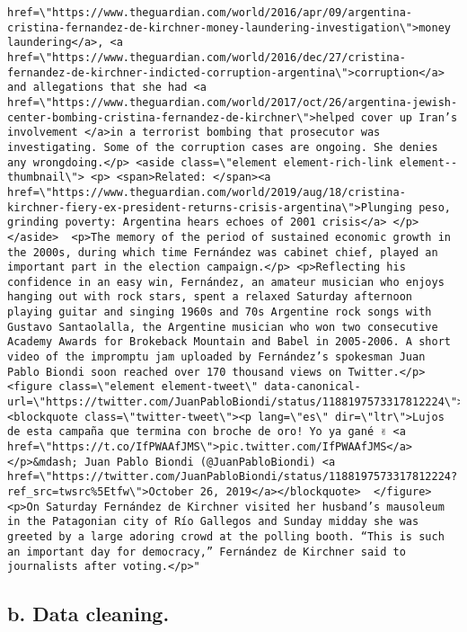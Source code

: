 \documentclass[]{article}
\begin{document}
\begin{verbatim}
href=\"https://www.theguardian.com/world/2016/apr/09/argentina-cristina-fernandez-de-kirchner-money-laundering-investigation\">money laundering</a>, <a href=\"https://www.theguardian.com/world/2016/dec/27/cristina-fernandez-de-kirchner-indicted-corruption-argentina\">corruption</a> and allegations that she had <a href=\"https://www.theguardian.com/world/2017/oct/26/argentina-jewish-center-bombing-cristina-fernandez-de-kirchner\">helped cover up Iran’s involvement </a>in a terrorist bombing that prosecutor was investigating. Some of the corruption cases are ongoing. She denies any wrongdoing.</p> <aside class=\"element element-rich-link element--thumbnail\"> <p> <span>Related: </span><a href=\"https://www.theguardian.com/world/2019/aug/18/cristina-kirchner-fiery-ex-president-returns-crisis-argentina\">Plunging peso, grinding poverty: Argentina hears echoes of 2001 crisis</a> </p> </aside>  <p>The memory of the period of sustained economic growth in the 2000s, during which time Fernández was cabinet chief, played an important part in the election campaign.</p> <p>Reflecting his confidence in an easy win, Fernández, an amateur musician who enjoys hanging out with rock stars, spent a relaxed Saturday afternoon playing guitar and singing 1960s and 70s Argentine rock songs with Gustavo Santaolalla, the Argentine musician who won two consecutive Academy Awards for Brokeback Mountain and Babel in 2005-2006. A short video of the impromptu jam uploaded by Fernández’s spokesman Juan Pablo Biondi soon reached over 170 thousand views on Twitter.</p>  <figure class=\"element element-tweet\" data-canonical-url=\"https://twitter.com/JuanPabloBiondi/status/1188197573317812224\">  <blockquote class=\"twitter-tweet\"><p lang=\"es\" dir=\"ltr\">Lujos de esta campaña que termina con broche de oro! Yo ya gané ✌️ <a href=\"https://t.co/IfPWAAfJMS\">pic.twitter.com/IfPWAAfJMS</a></p>&mdash; Juan Pablo Biondi (@JuanPabloBiondi) <a href=\"https://twitter.com/JuanPabloBiondi/status/1188197573317812224?ref_src=twsrc%5Etfw\">October 26, 2019</a></blockquote>  </figure>  <p>On Saturday Fernández de Kirchner visited her husband’s mausoleum in the Patagonian city of Río Gallegos and Sunday midday she was greeted by a large adoring crowd at the polling booth. “This is such an important day for democracy,” Fernández de Kirchner said to journalists after voting.</p>"
\end{verbatim}

\hypertarget{b.-data-cleaning.}{%
\subsection{b. Data cleaning.}\label{b.-data-cleaning.}}
\end{document}
